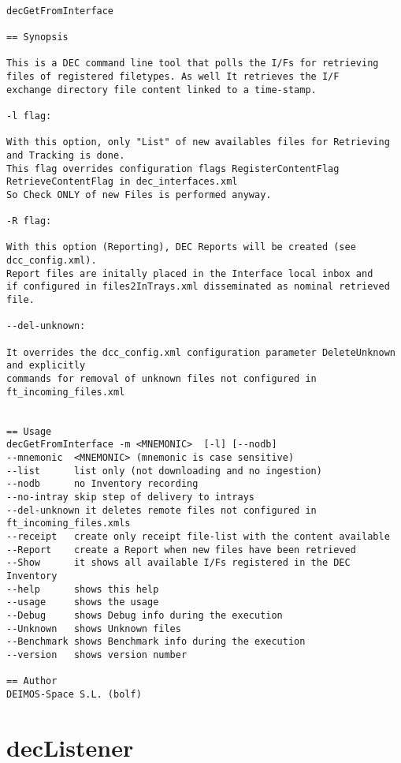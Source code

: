 \documentclass[dec_sum_main.tex]{subfiles}
\begin{document}
\begin{verbatim}

decGetFromInterface 

== Synopsis

This is a DEC command line tool that polls the I/Fs for retrieving 
files of registered filetypes. As well It retrieves the I/F 
exchange directory file content linked to a time-stamp.

-l flag:

With this option, only "List" of new availables files for Retrieving and Tracking is done.
This flag overrides configuration flags RegisterContentFlag RetrieveContentFlag in dec_interfaces.xml
So Check ONLY of new Files is performed anyway.

-R flag:

With this option (Reporting), DEC Reports will be created (see dcc_config.xml). 
Report files are initally placed in the Interface local inbox and
if configured in files2InTrays.xml disseminated as nominal retrieved file.

--del-unknown:

It overrides the dcc_config.xml configuration parameter DeleteUnknown and explicitly
commands for removal of unknown files not configured in ft_incoming_files.xml


== Usage
decGetFromInterface -m <MNEMONIC>  [-l] [--nodb]
--mnemonic  <MNEMONIC> (mnemonic is case sensitive)
--list      list only (not downloading and no ingestion)
--nodb      no Inventory recording
--no-intray skip step of delivery to intrays
--del-unknown it deletes remote files not configured in ft_incoming_files.xmls
--receipt   create only receipt file-list with the content available
--Report    create a Report when new files have been retrieved
--Show      it shows all available I/Fs registered in the DEC Inventory
--help      shows this help
--usage     shows the usage
--Debug     shows Debug info during the execution
--Unknown   shows Unknown files
--Benchmark shows Benchmark info during the execution
--version   shows version number

== Author
DEIMOS-Space S.L. (bolf)

\end{verbatim}

\section{decListener}
\end{document}
